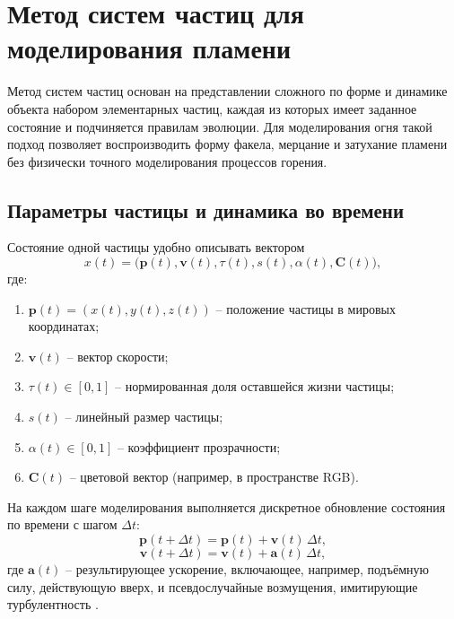 \section{Метод систем частиц для моделирования пламени}

Метод систем частиц основан на представлении сложного по форме и динамике объекта набором элементарных частиц, каждая из которых имеет заданное состояние и подчиняется правилам эволюции.\cite{Reeves1983} Для моделирования огня такой подход позволяет воспроизводить форму факела, мерцание и затухание пламени без физически точного моделирования процессов горения.

\subsection{Параметры частицы и динамика во времени}

Состояние одной частицы удобно описывать вектором
\begin{equation}
	x(t) = \bigl( \mathbf{p}(t), \mathbf{v}(t), \tau(t), s(t), \alpha(t), \mathbf{C}(t) \bigr),
\end{equation}
где:
\begin{enumerate}
	\item $\mathbf{p}(t) = (x(t), y(t), z(t))$ -- положение частицы в мировых координатах;
	\item $\mathbf{v}(t)$ -- вектор скорости;
	\item $\tau(t) \in [0, 1]$ -- нормированная доля оставшейся жизни частицы;
	\item $s(t)$ -- линейный размер частицы;
	\item $\alpha(t) \in [0, 1]$ -- коэффициент прозрачности;
	\item $\mathbf{C}(t)$ -- цветовой вектор (например, в пространстве RGB).
\end{enumerate}

На каждом шаге моделирования выполняется дискретное обновление состояния по времени с шагом $\Delta t$:
\begin{equation}
	\mathbf{p}(t + \Delta t) = \mathbf{p}(t) + \mathbf{v}(t)\,\Delta t,
\end{equation}
\begin{equation}
	\mathbf{v}(t + \Delta t) = \mathbf{v}(t) + \mathbf{a}(t)\,\Delta t,
\end{equation}
где $\mathbf{a}(t)$ -- результирующее ускорение, включающее, например, подъёмную силу, действующую вверх, и псевдослучайные возмущения, имитирующие турбулентность \cite{DemCG}.

